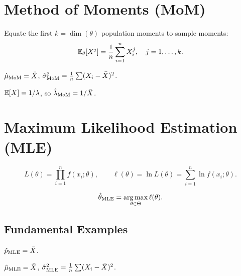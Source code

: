 \section{Method of Moments (MoM)}

\begin{definition}
Equate the first $k=\dim(\theta)$ population moments to sample moments:
\[
\mathbb{E}_\theta[X^j] = \frac{1}{n}\sum_{i=1}^n X_i^j, \quad j=1,\ldots,k.
\]
\end{definition}

\begin{example}
$\hat{\mu}_{\mathrm{MoM}} = \bar{X}$, $\hat{\sigma}^2_{\mathrm{MoM}} = \frac{1}{n}\sum(X_i-\bar{X})^2$.
\end{example}

\begin{example}
$\mathbb{E}[X]=1/\lambda$, so $\hat{\lambda}_{\mathrm{MoM}} = 1/\bar{X}$.
\end{example}

\section{Maximum Likelihood Estimation (MLE)}

\begin{definition}
\[
L(\theta) = \prod_{i=1}^n f(x_i;\theta), \qquad \ell(\theta)=\ln L(\theta) = \sum_{i=1}^n \ln f(x_i;\theta).
\]
\end{definition}

\begin{definition}
\[
\hat{\theta}_{\mathrm{MLE}} = \operatorname*{arg\,max}_{\theta\in\Theta} \ell(\theta).
\]
\end{definition}

\subsection{Fundamental Examples}

\begin{example}[Bernoulli]
$\hat{p}_{\mathrm{MLE}} = \bar{X}$.
\end{example}

\begin{example}[Normal]
$\hat{\mu}_{\mathrm{MLE}} = \bar{X}$, $\hat{\sigma}^2_{\mathrm{MLE}} = \frac{1}{n}\sum(X_i-\bar{X})^2$.
\end{example}

